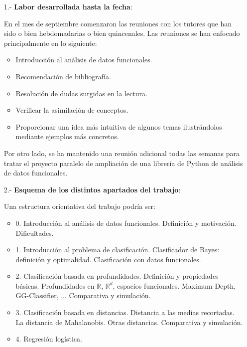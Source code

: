 \documentclass[a4paper,oneside,11pt,leqno]{article}
\begin{document}
\begin{enumerate}

      \item[1.-] {\bf Labor desarrollada hasta la fecha}:

            En el mes de septiembre comenzaron las reuniones con los tutores que han sido o bien hebdomadarias o bien quincenales.
            Las reuniones se han enfocado principalmente en lo siguiente:
            \begin{itemize}
                  \item Introducción al análisis de datos funcionales.
                  \item Recomendación de bibliografía.
                  \item Resolución de dudas surgidas en la lectura.
                  \item Verificar la asimilación de conceptos.
                  \item Proporcionar una idea más intuitiva de algunos temas ilustrándolos mediante ejemplos más concretos.
            \end{itemize}

            Por otro lado, se ha mantenido una reunión adicional todas las semanas para tratar el proyecto paralelo de ampliación
            de una librería de Python \cite{scikit-fda} de análisis de datos funcionales.

      \item[2.-] {\bf Esquema de los distintos apartados del trabajo}:

            Una estructura orientativa del trabajo podría ser:

            \begin{itemize}
                  \item 0. Introducción al análisis de datos funcionales.
                         Definición y motivación.
                         Dificultades.
                  \item 1. Introducción al problema de clasificación.
                         Clasificador de Bayes: definición y optimalidad.
                         Clasificación con datos funcionales.
                  \item 2. Clasificación basada en profundidades.
                         Definición y propiedades básicas.
                         Profundidades en $\mathbb{R}$, $\mathbb{R}^d$, espacios funcionales.
                         Maximum Depth, GG-Classifier, ...
                         Comparativa y simulación.
                  \item 3. Clasificación basada en distancias.
                         Distancia a las medias recortadas.
                         La distancia de Mahalanobis.
                         Otras distancias.
                         Comparativa y simulación.
                  \item 4. Regresión logística.
            \end{itemize}


\end{enumerate}
\end{document}
